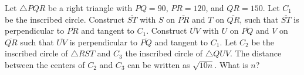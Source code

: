 Let $\triangle{PQR}$ be a right triangle with $PQ=90$, $PR=120$, and $QR=150$. Let $C_{1}$ be the inscribed circle. Construct $\overline{ST}$ with $S$ on $\overline{PR}$ and $T$ on $\overline{QR}$, such that $\overline{ST}$ is perpendicular to $\overline{PR}$ and tangent to $C_{1}$. Construct $\overline{UV}$ with $U$ on $\overline{PQ}$ and $V$ on $\overline{QR}$ such that $\overline{UV}$ is perpendicular to $\overline{PQ}$ and tangent to $C_{1}$. Let $C_{2}$ be the inscribed circle of $\triangle{RST}$ and $C_{3}$ the inscribed circle of $\triangle{QUV}$. The distance between the centers of $C_{2}$ and $C_{3}$ can be written as $\sqrt{10n}$. What is $n$?